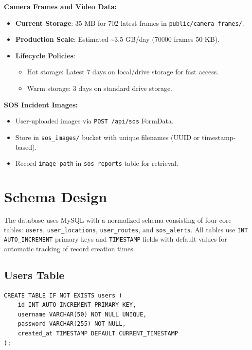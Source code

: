 \textbf{Camera Frames and Video Data:}
\begin{itemize}
    \item \textbf{Current Storage}: 35 MB for 702 latest frames in \texttt{public/camera\_frames/}.
    \item \textbf{Production Scale}: Estimated \textasciitilde3.5 GB/day (70000 frames \texttimes{} 50 KB).
    \item \textbf{Lifecycle Policies}: 
    \begin{itemize}
        \item Hot storage: Latest 7 days on local/drive storage for fast access.
        \item Warm storage: 3 days on standard drive storage.
    \end{itemize}
\end{itemize}

\textbf{SOS Incident Images:}
\begin{itemize}
    \item User-uploaded images via \texttt{POST /api/sos} FormData.
    \item Store in \texttt{sos\_images/} bucket with unique filenames (UUID or timestamp-based).
    \item Record \texttt{image\_path} in \texttt{sos\_reports} table for retrieval.
\end{itemize}

\section{Schema Design}

The database uses MySQL with a normalized schema consisting of four core tables: \texttt{users}, \texttt{user\_locations}, \texttt{user\_routes}, and \texttt{sos\_alerts}. All tables use \texttt{INT AUTO\_INCREMENT} primary keys and \texttt{TIMESTAMP} fields with default values for automatic tracking of record creation times.

\subsection{Users Table}

\begin{verbatim}
CREATE TABLE IF NOT EXISTS users (
    id INT AUTO_INCREMENT PRIMARY KEY,
    username VARCHAR(50) NOT NULL UNIQUE,
    password VARCHAR(255) NOT NULL,
    created_at TIMESTAMP DEFAULT CURRENT_TIMESTAMP
);
\end{verbatim}

